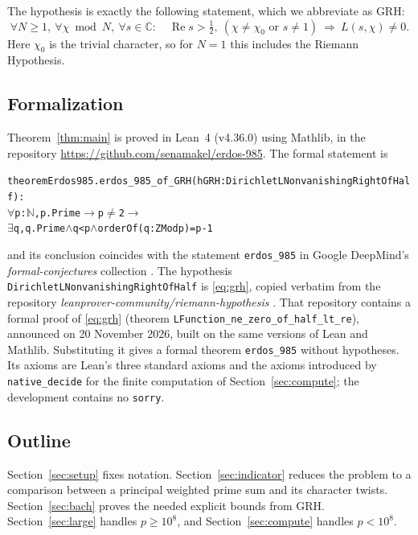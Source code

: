\documentclass[11pt]{amsart}
\theoremstyle{definition}
\theoremstyle{remark}
\renewcommand{\Re}{\operatorname{Re}}
\newcommand{\lean}[1]{\texttt{#1}}
\begin{document}
The hypothesis is exactly the following statement, which we abbreviate as GRH:
\begin{equation}\label{eq:grh}
\forall N\ge 1,\ \forall \chi \bmod N,\ \forall s\in\mathbb{C}:\quad \Re s>\tfrac12,\ (\chi\ne\chi_0 \text{ or } s\ne 1)\ \Longrightarrow\ L(s,\chi)\neq 0 .
\end{equation}
Here $\chi_0$ is the trivial character, so for $N=1$ this includes the Riemann Hypothesis.

\subsection*{Formalization} Theorem~\ref{thm:main} is proved in Lean~4 (v4.36.0) using Mathlib, in the repository \url{https://github.com/senamakel/erdos-985}. The formal statement is
\begin{small}\begin{alltt}
theorem Erdos985.erdos_985_of_GRH (hGRH : DirichletLNonvanishingRightOfHalf) :
    \(\forall\) p : \(\mathbb{N}\), p.Prime \(\to\) p \(\neq\) 2 \(\to\)
      \(\exists\) q, q.Prime \(\wedge\) q < p \(\wedge\) orderOf (q : ZMod p) = p - 1
\end{alltt}\end{small}
and its conclusion coincides with the statement \lean{erdos\_985} in Google DeepMind's \emph{formal-conjectures} collection \cite{formalconj}. The hypothesis \lean{DirichletLNonvanishingRightOfHalf} is \eqref{eq:grh}, copied verbatim from the repository \emph{leanprover-community/riemann-hypothesis} \cite{rhrepo}. That repository contains a formal proof of \eqref{eq:grh} (theorem \lean{LFunction\_ne\_zero\_of\_half\_lt\_re}), announced on 20 November 2026, built on the same versions of Lean and Mathlib. Substituting it gives a formal theorem \lean{erdos\_985} without hypotheses. Its axioms are Lean's three standard axioms and the axioms introduced by \lean{native\_decide} for the finite computation of Section~\ref{sec:compute}; the development contains no \lean{sorry}.

\subsection*{Outline} Section~\ref{sec:setup} fixes notation. Section~\ref{sec:indicator} reduces the problem to a comparison between a principal weighted prime sum and its character twists. Section~\ref{sec:bach} proves the needed explicit bounds from GRH. Section~\ref{sec:large} handles $p\ge 10^8$, and Section~\ref{sec:compute} handles $p<10^8$.
\end{document}
